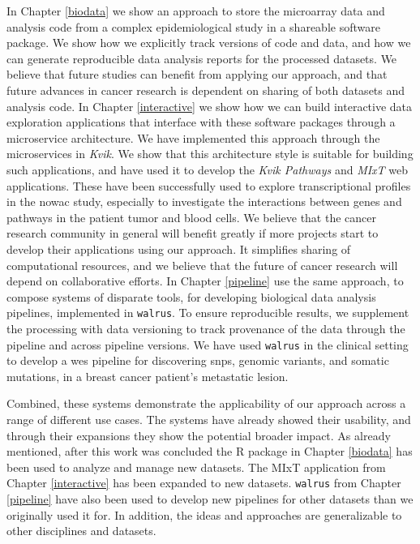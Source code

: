 In Chapter \ref{biodata} we show an approach to store the microarray data and
analysis code from a complex epidemiological study in a shareable software
package. We show how we explicitly track versions of code and data, and how we
can generate reproducible data analysis reports for the processed datasets.
We believe that future studies can benefit from applying our approach, and that
future advances in cancer research is dependent on sharing of both datasets and
analysis code. 
In Chapter \ref{interactive} we show how we can build interactive data
exploration applications that interface with these software packages through a
microservice architecture. We have implemented this approach through the
microservices in \emph{Kvik}. We show that this architecture style is suitable
for building such applications, and have used it to develop the \emph{Kvik
Pathways} and \emph{MIxT} web applications. These have been successfully used to
explore transcriptional profiles in the \gls{nowac} study, especially to
investigate the interactions between genes and pathways in the patient tumor and
blood cells.  We believe that the cancer research community in general will
benefit greatly if more projects start to develop their applications using our
approach. It simplifies sharing of computational resources, and we believe that
the future of cancer research will depend on collaborative efforts.  In Chapter
\ref{pipeline} use the same approach, to compose systems of disparate tools, for
developing biological data analysis pipelines, implemented in \texttt{walrus}.
To ensure reproducible results, we supplement the processing with data
versioning to track provenance of the data through the pipeline and across
pipeline versions. We have used \texttt{walrus} in the clinical setting to
develop a \gls{wes} pipeline for discovering \glspl{snp}, genomic variants, and
somatic mutations, in a breast cancer patient's metastatic lesion. 

Combined, these systems demonstrate the applicability of our approach across a
range of different use cases. The systems have already showed their usability,
and through their expansions they show the potential broader impact. As
already mentioned, after this work was concluded the R package in Chapter
\ref{biodata} has been used to analyze and manage new datasets. The MIxT
application from Chapter \ref{interactive} has been expanded to new datasets.
\texttt{walrus} from Chapter \ref{pipeline} have also been used to develop new
pipelines for other datasets than we originally used it for. In addition, the
ideas and approaches are generalizable to other disciplines and datasets. 


